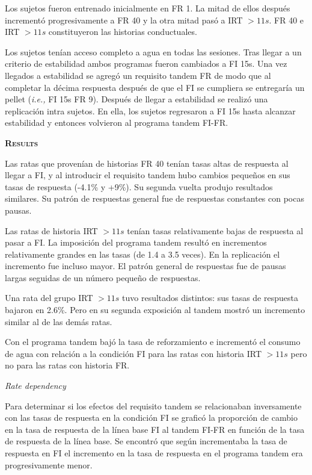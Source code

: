 \documentclass[a4paper,12pt]{article}
\begin{document}
Los sujetos fueron entrenado inicialmente en FR 1. La mitad de ellos después incrementó progresivamente a FR 40 y la otra mitad pasó a IRT $> 11s$. FR 40 e IRT $> 11s$ constituyeron las historias conductuales.

Los sujetos tenían acceso completo a agua en todas las sesiones. Tras llegar a un criterio de estabilidad ambos programas fueron cambiados a FI 15s. Una vez llegados a estabilidad se agregó un requisito tandem FR de modo que al completar la décima respuesta después de que el FI se cumpliera se entregaría un pellet ({\itshape i.e.,} FI 15s FR 9). Después de llegar a estabilidad se realizó una replicación intra sujetos. En ella, los sujetos regresaron a FI 15s hasta alcanzar estabilidad y entonces volvieron al programa tandem FI-FR.

{\scshape\bfseries Results}

Las ratas que provenían de historias FR 40 tenían tasas altas de respuesta al llegar a FI, y al introducir el requisito tandem hubo cambios pequeños en sus tasas de respuesta (-4.1\% y +9\%). Su segunda vuelta produjo resultados similares. Su patrón de respuestas general fue de respuestas constantes con pocas pausas.

Las ratas de historia IRT $> 11s$ tenían tasas relativamente bajas de respuesta al pasar a FI. La imposición del programa tandem resultó en incrementos relativamente grandes en las tasas (de 1.4 a 3.5 veces). En la replicación el incremento fue incluso mayor. El patrón general de respuestas fue de pausas largas seguidas de un número pequeño de respuestas.

Una rata del grupo IRT $> 11s$ tuvo resultados distintos: sus tasas de respuesta bajaron en 2.6\%. Pero en su segunda exposición al tandem mostró un incremento similar al de las demás ratas.

Con el programa tandem bajó la tasa de reforzamiento e incrementó el consumo de agua con relación a la condición FI para las ratas con historia IRT $> 11s$ pero no para las ratas con historia FR.

{\itshape Rate dependency}

Para determinar si los efectos del requisito tandem se relacionaban inversamente con las tasas de respuesta en la condición FI se graficó la proporción de cambio en la tasa de respuesta de la línea base FI al tandem FI-FR en función de la tasa de respuesta de la línea base. Se encontró que según incrementaba la tasa de respuesta en FI el incremento en la tasa de respuesta en el programa tandem era progresivamente menor.
\end{document}
